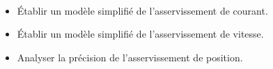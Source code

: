 \begin{multicols}{2}
\begin{obj} ~\\
%
\begin{itemize}
\item Établir un modèle simplifié de l'asservissement de courant.
\item Établir un modèle simplifié de l'asservissement de vitesse.
\item Analyser la précision de l'asservissement de position.
\end{itemize}
\end{obj}
%
%
%
%
%
%
%
%
%
%
%
%
%

\end{multicols}
